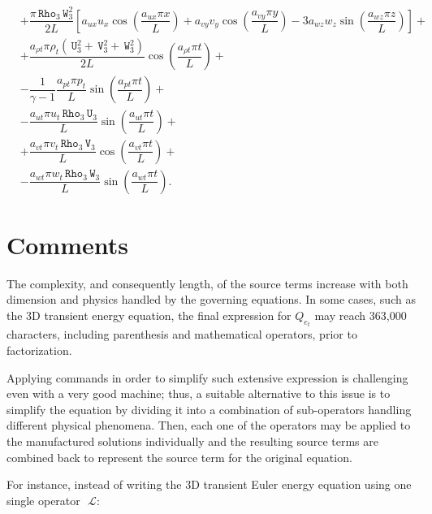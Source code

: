\documentclass[10pt]{article}
\newcommand{\Rho}{\,\mathtt{Rho}}
\newcommand{\U}{\,\mathtt{U}}
\newcommand{\V}{\,\mathtt{V}}
\newcommand{\W}{\,\mathtt{W}}
\newcommand{\Lo}{\,\mathcal{L}}
\begin{document}
\begin{equation}
\begin{split}
&+\dfrac{\pi \Rho_3 \W_3^2}{2L}\left[a_{ux} u_x \cos\left(\dfrac{a_{ux} \pi x}{L}\right)+a_{vy} v_y \cos\left(\dfrac{a_{vy} \pi y}{L}\right)-3 a_{wz} w_z \sin\left(\dfrac{a_{wz} \pi z}{L}\right)\right] +\\
&+   \dfrac{ a_{\rho t} \pi \rho_t(\U_3^2+\V_3^2+\W_3^2)}{2L}\cos\left(\dfrac{a_{\rho t} \pi  t}{L}\right) +\\
&-\dfrac{1}{\gamma-1}\dfrac{ a_{pt}\pi p_t }{L}\sin\left(\dfrac{a_{pt} \pi  t}{L}\right)+\\
&-\dfrac{ a_{ut}\pi u_t \Rho_3 \U_3 }{L}\sin\left(\dfrac{a_{ut} \pi  t}{L}\right)+\\
&+\dfrac{ a_{vt}\pi v_t \Rho_3 \V_3 }{L}\cos\left(\dfrac{a_{vt} \pi t}{L}\right)+\\
&-\dfrac{ a_{wt}\pi w_t \Rho_3 \W_3 }{L}\sin\left(\dfrac{a_{wt} \pi  t}{L}\right).
 \end{split}
\end{equation}

\section{Comments}

The complexity, and consequently length, of the source terms increase with both dimension and physics handled by the governing equations. In some cases, such as the 3D transient energy equation, the final expression for $Q_{e_t}$ may reach 363,000 characters, including parenthesis and mathematical operators, prior to factorization.

Applying commands in order to simplify such extensive expression is challenging even with a very good machine; thus, a suitable alternative to this issue is to simplify the equation by dividing it into a combination of sub-operators handling different physical phenomena. Then, each one of the operators may be applied to the manufactured solutions individually and the resulting source terms are combined back to represent the source term for the original equation.


For instance, instead of writing the 3D transient Euler energy equation using one single operator~$\Lo$:
\end{document}
